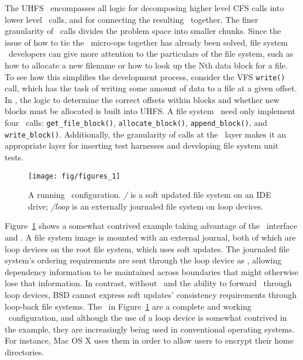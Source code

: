 The UHFS \module\ encompasses all logic for decomposing higher level CFS calls
into lower level \LFS\ calls, and for connecting the resulting \chdescs\
together. The finer granularity of \LFS\ calls divides the problem space into
smaller chunks. Since the issue of how to tie the \LFS\ micro-ops together has
already been solved, file system \module\ developers can give more attention to
the particulars of the file system, such as how to allocate a new filename or
how to look up the Nth data block for a file. To see how this simplifies the
development process, consider the VFS \texttt{write()} call, which has the task
of writing some amount of data to a file at a given offset. In \Kudos, the logic
to determine the correct offsets within blocks and whether new blocks must be
allocated is built into UHFS. A file system \module\ need only implement four
\LFS\ calls: \texttt{get\_file\_block()}, \texttt{allocate\_block()},
\texttt{append\_block()}, and \texttt{write\_block()}. Additionally, the
granularity of calls at the \LFS\ layer makes it an appropriate layer for
inserting test harnesses and developing file system unit tests.

\begin{figure}[tb]
  \centering
  \texttt{[image: fig/figures\_1]}
  \caption{A running \Kudos\ configuration. {\it/} is a soft updated
    file system on an IDE drive; {\it/loop} is an externally journaled
    file system on loop devices.}
  \label{fig:kfs-graph}
\end{figure}

Figure~\ref{fig:kfs-graph} shows a somewhat contrived example taking advantage
of the \LFS\ interface and \chdescs. A file system image is mounted with an
external journal, both of which are loop devices on the root file system, which
uses soft updates. The journaled file system's ordering requirements are sent
through the loop device as \chdescs, allowing dependency information to be
maintained across boundaries that might otherwise lose that information. In
contrast, without \chdescs\ and the ability to forward \chdescs\ through loop
devices, BSD cannot express soft updates' consistency requirements through
loop-back file systems. The \modules\ in Figure~\ref{fig:kfs-graph} are a
complete and working \Kudos\ configuration, and although the use of a loop
device is somewhat contrived in the example, they are increasingly being used in
conventional operating systems. For instance, Mac OS X uses them in order to
allow users to encrypt their home directories.
